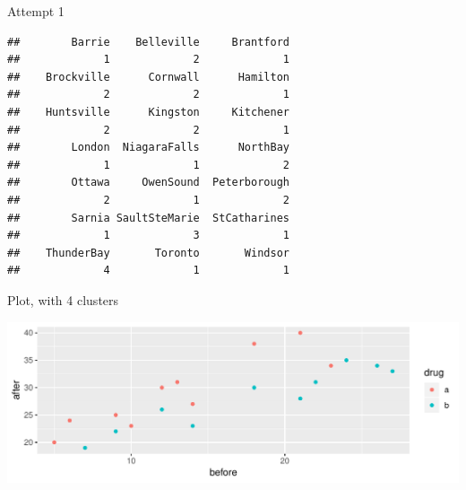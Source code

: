 \begin{frame}[fragile]{Attempt 1}

  {\small
\begin{knitrout}
\color{fgcolor}\begin{kframe}
\begin{alltt}
\hlkwb{=}\hlstd{(}\hlstd{,}
\hlkwb{=}
\hlkwb{=}\hlstd{=}\hlstd{)}
\hlstd{)}
\end{alltt}
\begin{verbatim}
##        Barrie    Belleville     Brantford 
##             1             2             1 
##    Brockville      Cornwall      Hamilton 
##             2             2             1 
##    Huntsville      Kingston     Kitchener 
##             2             2             1 
##        London  NiagaraFalls      NorthBay 
##             1             1             2 
##        Ottawa     OwenSound  Peterborough 
##             2             1             2 
##        Sarnia SaultSteMarie  StCatharines 
##             1             3             1 
##    ThunderBay       Toronto       Windsor 
##             4             1             1
\end{verbatim}
\end{kframe}
\end{knitrout}
}
  
\end{frame}

\begin{frame}[fragile]{Plot, with 4 clusters}
  
\begin{knitrout}
\color{fgcolor}\begin{kframe}
\begin{alltt}
\hlstd{)}
\end{alltt}
\end{kframe}
\includegraphics[width=\maxwidth]{figure/unnamed-chunk-58-1} 

\end{knitrout}
\end{frame}

